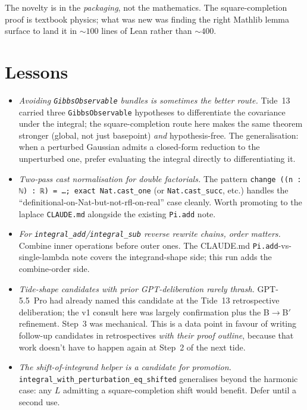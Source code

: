 \documentclass[11pt]{article}
\begin{document}
The novelty is in the \emph{packaging}, not the mathematics. The
square-completion proof is textbook physics; what was new was finding
the right Mathlib lemma surface to land it in $\sim 100$ lines of
Lean rather than $\sim 400$.

\section{Lessons}

\begin{itemize}
\item \emph{Avoiding \texttt{GibbsObservable} bundles is sometimes the
  better route.} Tide~13 carried three \texttt{GibbsObservable}
  hypotheses to differentiate the covariance under the integral; the
  square-completion route here makes the same theorem stronger
  (global, not just basepoint) \emph{and} hypothesis-free. The
  generalisation: when a perturbed Gaussian admits a closed-form
  reduction to the unperturbed one, prefer evaluating the integral
  directly to differentiating it.

\item \emph{Two-pass cast normalisation for double factorials.} The
  pattern \texttt{change ((n : ℕ) : ℝ) = …; exact Nat.cast\_one} (or
  \texttt{Nat.cast\_succ}, etc.) handles the
  ``definitional-on-Nat-but-not-rfl-on-real'' case cleanly. Worth
  promoting to the laplace \texttt{CLAUDE.md} alongside the existing
  \texttt{Pi.add} note.

\item \emph{For \texttt{integral\_add}/\texttt{integral\_sub} reverse
  rewrite chains, order matters.} Combine inner operations before
  outer ones. The CLAUDE.md \texttt{Pi.add}-vs-single-lambda note
  covers the integrand-shape side; this run adds the
  combine-order side.

\item \emph{Tide-shape candidates with prior GPT-deliberation rarely
  thrash.} GPT-5.5~Pro had already named this candidate at the
  Tide~13 retrospective deliberation; the v1 consult here was largely
  confirmation plus the B$\to$B$'$ refinement. Step~3 was
  mechanical. This is a data point in favour of writing follow-up
  candidates in retrospectives \emph{with their proof outline},
  because that work doesn't have to happen again at Step~2 of the
  next tide.

\item \emph{The shift-of-integrand helper is a candidate for
  promotion.} \texttt{integral\_with\_perturbation\_eq\_shifted}
  generalises beyond the harmonic case: any $L$ admitting a
  square-completion shift would benefit. Defer until a second use.
\end{itemize}
\end{document}
